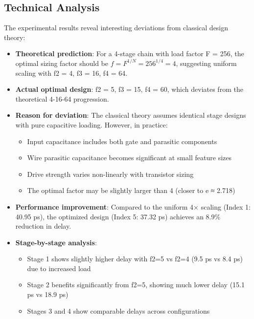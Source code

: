 \documentclass[UTF8,12pt,a4paper]{ctexart}
\begin{document}
\subsection{Technical Analysis}

The experimental results reveal interesting deviations from classical design theory:

\begin{itemize}
    \item \textbf{Theoretical prediction}: For a 4-stage chain with load factor F = 256, the optimal sizing factor should be $f = F^{1/N} = 256^{1/4} = 4$, suggesting uniform scaling with f2 = 4, f3 = 16, f4 = 64.
    
    \item \textbf{Actual optimal design}: f2 = 5, f3 = 15, f4 = 60, which deviates from the theoretical 4-16-64 progression.
    
    \item \textbf{Reason for deviation}: The classical theory assumes identical stage designs with pure capacitive loading. However, in practice:
    \begin{itemize}
        \item Input capacitance includes both gate and parasitic components
        \item Wire parasitic capacitance becomes significant at small feature sizes
        \item Drive strength varies non-linearly with transistor sizing
        \item The optimal factor may be slightly larger than 4 (closer to e ≈ 2.718)
    \end{itemize}
    
    \item \textbf{Performance improvement}: Compared to the uniform 4× scaling (Index 1: 40.95 ps), the optimized design (Index 5: 37.32 ps) achieves an 8.9\% reduction in delay.
    
    \item \textbf{Stage-by-stage analysis}: 
    \begin{itemize}
        \item Stage 1 shows slightly higher delay with f2=5 vs f2=4 (9.5 ps vs 8.4 ps) due to increased load
        \item Stage 2 benefits significantly from f2=5, showing much lower delay (15.1 ps vs 18.9 ps)
        \item Stages 3 and 4 show comparable delays across configurations
    \end{itemize}
\end{itemize}
\end{document}
